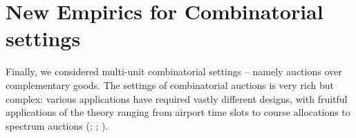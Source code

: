 \documentclass{article} %
\begin{document}





\section{New Empirics for Combinatorial settings}\label{session:combinatorial}
Finally, we considered multi-unit combinatorial settings -- namely auctions over complementary goods. 
The settings of combinatorial auctions is very rich but complex: various applications have required vastly different designs, with fruitful applications of the theory ranging from airport time slots to course allocations to spectrum auctions (\cite{rassenti1982combinatorial}; \cite{budish2011combinatorial}; \cite{milgrom2020clock}).
\end{document}
